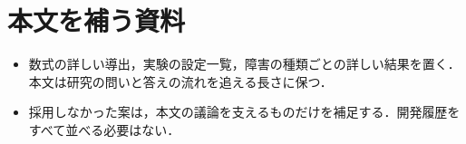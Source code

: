 \appendix
\setcounter{section}{0}
\renewcommand{\thesection}{\Alph{section}}

\section{本文を補う資料}
\label{sec:appendix}
\begin{itemize}
    \item 数式の詳しい導出，実験の設定一覧，障害の種類ごとの詳しい結果を置く．本文は研究の問いと答えの流れを追える長さに保つ．
    \item 採用しなかった案は，本文の議論を支えるものだけを補足する．開発履歴をすべて並べる必要はない．
\end{itemize}



